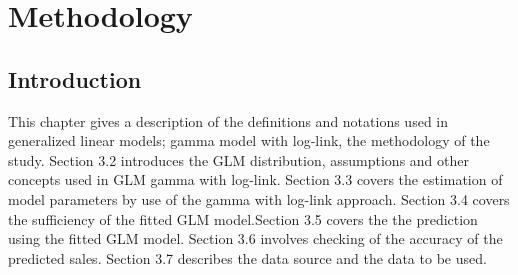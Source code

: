 \chapter{Methodology} 
\label{Chapter3} 
\section{Introduction}
This chapter gives a description of the definitions and notations used in generalized linear models; gamma model with log-link,
the methodology of the study. Section 3.2 introduces the GLM distribution, assumptions and other concepts used in GLM gamma with log-link. Section 3.3 covers the estimation of model parameters by use of the gamma with log-link approach. Section 3.4 covers the sufficiency of the fitted GLM model.Section 3.5 covers the the prediction using the fitted GLM model. Section 3.6 involves checking of the accuracy of the predicted sales. Section 3.7 describes the data source and the data to be used. 

